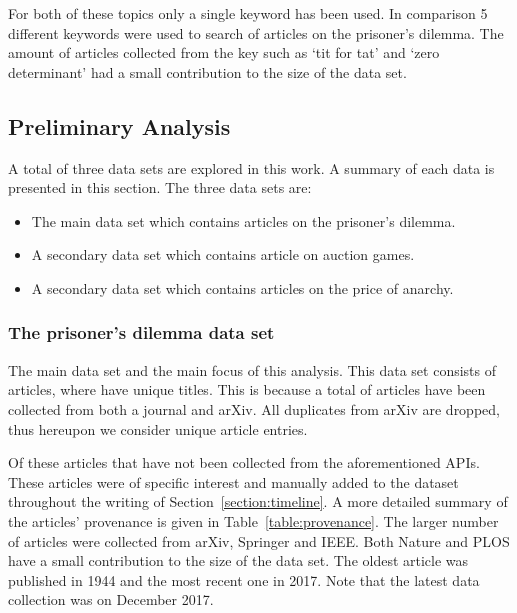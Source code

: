 \documentclass{article}
\theoremstyle{definition}
\newcommand{\totalarticles}{}
\newcommand{\uniquetitles}{}
\newcommand{\numberofduplicates}{}
\newcommand{\manual}{}
\begin{document}
For both of these topics only a single keyword has been used. In comparison 5
different keywords were used to search of articles on the prisoner's dilemma.
The amount of articles collected from the key such as `tit for tat' and
`zero determinant' had a small contribution to the size of the data set.

\subsection{Preliminary Analysis}\label{section:preliminary_analysis}

A total of three data sets are explored in this work. A summary of each data is
presented in this section. The three data sets are:

\begin{itemize}
    \item The main data set which contains articles on the prisoner's dilemma.
    \item A secondary data set which contains article on auction games.
    \item A secondary data set which contains articles on the price of anarchy.
\end{itemize}

\subsubsection{The prisoner's dilemma data set}

The main data set and the main focus of this analysis. This data set
consists of \totalarticles articles, where \uniquetitles have unique titles.
This is because a total of \numberofduplicates articles have been collected from
both a journal and arXiv. All duplicates from arXiv are dropped, thus hereupon
we consider \uniquetitles unique article entries.

Of these \totalarticles \manual articles that have not been collected from the
aforementioned APIs. These articles were of specific interest and manually added to the
dataset throughout
the writing of Section~\ref{section:timeline}. A more detailed summary of the 
articles' provenance is given in Table~\ref{table:provenance}.
The larger number of articles were collected from arXiv, Springer and IEEE. Both
Nature and PLOS have a small contribution to the size of the data set. The oldest
article was published in 1944 and the most recent one in 2017. Note
that the latest data collection was on December 2017.
\end{document}
